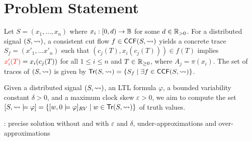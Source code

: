 \section{Problem Statement}

Let $S = (x_1, \ldots, x_n)$ where $x_i : [0,d) \to \mathbb{B}$ for some $d \in \mathbb{R}_{> 0}$.
For a distributed signal $(S,{\rightsquigarrow})$, a consistent cut flow $f \in \mathsf{CCF}(S,{\rightsquigarrow})$ yields a concrete trace $S_f = (x'_1, \ldots x'_n)$ such that $(c_j(T), x_i(c_j(T))) \in f(T)$ implies $\textcolor{red}{x_i'(T)} = x_i(c_j(T))$ for all $1 \leq i \leq n$ and $T \in \mathbb{R}_{\geq 0}$, where $A_j = \pi(x_i)$.
\alert{The set of traces of $(S,{\rightsquigarrow})$ is given by $\tr(S,{\hb}) = \{ S_f \st \exists f \in \CCF(S,{\hb})\}$.}


Given a distributed signal $(S, {\rightsquigarrow})$, an LTL formula $\varphi$, a bounded variability constant $\delta > 0$, and a maximum clock skew $\varepsilon > 0$, we aim to compute the set $[S, {\hb} \models \varphi] = \{ [w, 0 \models \varphi]_{RV} \st w \in \tr(S, {\hb}) \}$ of truth values.

\begin{example}
	\TODO: precise solution without and with $\varepsilon$ and $\delta$, under-approximations and over-approximations
\end{example}